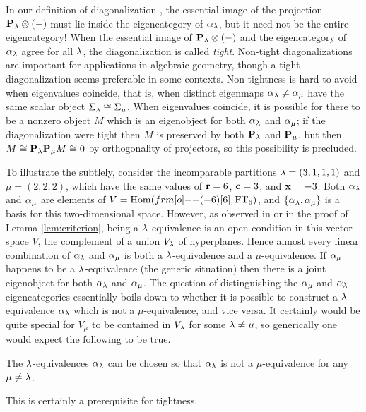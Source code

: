 In our definition of diagonalization \cite[Definition 6.16]{ElHog17a}, the essential image of the projection ${\mathbf P}_\lambda\otimes (-)$ must lie inside the eigencategory of $\alpha_\lambda$, but it need not be the entire eigencategory! When the essential image of ${\mathbf P}_\lambda\otimes (-)$ and the eigencategory of $\alpha_\lambda$ agree for all $\lambda$, the diagonalization is called \emph{tight}. Non-tight diagonalizations are important for applications in algebraic geometry, though a tight diagonalization seems preferable in some contexts. Non-tightness is hard to avoid when eigenvalues coincide, that is, when distinct eigenmaps $\alpha_\lambda \ne \alpha_\mu$ have the same scalar object $\Sigma_\lambda \cong \Sigma_\mu$. When eigenvalues coincide, it is possible for there to be a nonzero object $M$ which is an eigenobject for both $\alpha_\lambda$ and $\alpha_\mu$; if the diagonalization were tight then $M$ is preserved by both ${\mathbf P}_\lambda$ and ${\mathbf P}_\mu$, but then $M \cong {\mathbf P}_\lambda {\mathbf P}_\mu M \cong 0$ by
orthogonality of projectors, so this possibility is precluded.

To illustrate the subtlely, consider the incomparable partitions $\lambda=(3,1,1,1)$ and $\mu=(2,2,2)$, which have the same values of $\mathbf{r}=6$, $\mathbf{c}=3$, and $\mathbf{x}=-3$. Both $\alpha_\lambda$ and
$\alpha_\mu$ are elements of $V = \Hom(\one(-6)[6], \FT_6)$, and $\{\alpha_\lambda,\alpha_\mu\}$ is a basis for this two-dimensional space. However, as observed in \cite[\S 2]{ElHog17a} or in the proof
of Lemma \ref{lem:criterion}, being a $\lambda$-equivalence is an open condition in this vector space $V$, the complement of a union $V_\lambda$ of hyperplanes. Hence almost every linear
combination of $\alpha_\lambda$ and $\alpha_\mu$ is both a $\lambda$-equivalence and a $\mu$-equivalence. If $\alpha_\mu$ happens to be a $\lambda$-equivalence (the generic situation) then there is a joint eigenobject for both $\alpha_\lambda$ and $\alpha_\mu$.  The question of distinguishing the $\alpha_\mu$ and $\alpha_\lambda$ eigencategories essentially boils down to whether it is possible to construct a $\lambda$-equivalence $\alpha_\lambda$ which is not a $\mu$-equivalence, and vice versa. It certainly would be quite special for $V_\mu$ to be contained in $V_\lambda$ for some $\lambda\neq \mu$, so generically one would expect the following to be true.


\begin{conjecture}\label{conj:tightness0}
The $\lambda$-equivalences $\alpha_\lambda$ can be chosen so that $\alpha_\lambda$ is not a $\mu$-equivalence for any $\mu\neq \lambda$.
\end{conjecture}


This is certainly a prerequisite for tightness.

